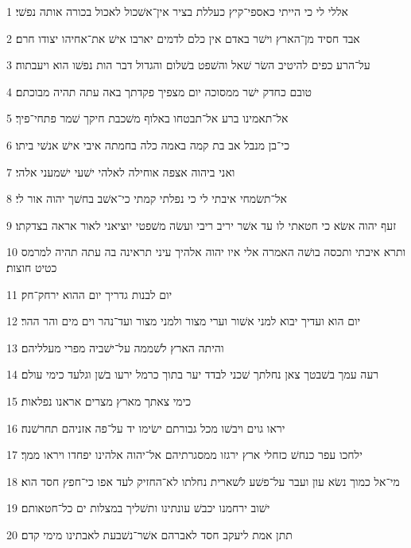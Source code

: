 \par 1 אללי לי כי הייתי כאספי־קיץ כעללת בציר אין־אשׁכול לאכול בכורה אותה נפשׁי׃
\par 2 אבד חסיד מן־הארץ וישׁר באדם אין כלם לדמים יארבו אישׁ את־אחיהו יצודו חרם׃
\par 3 על־הרע כפים להיטיב השׂר שׁאל והשׁפט בשׁלום והגדול דבר הות נפשׁו הוא ויעבתוה׃
\par 4 טובם כחדק ישׁר ממסוכה יום מצפיך פקדתך באה עתה תהיה מבוכתם׃
\par 5 אל־תאמינו ברע אל־תבטחו באלוף משׁכבת חיקך שׁמר פתחי־פיך׃
\par 6 כי־בן מנבל אב בת קמה באמה כלה בחמתה איבי אישׁ אנשׁי ביתו׃
\par 7 ואני ביהוה אצפה אוחילה לאלהי ישׁעי ישׁמעני אלהי׃
\par 8 אל־תשׂמחי איבתי לי כי נפלתי קמתי כי־אשׁב בחשׁך יהוה אור לי׃
\par 9 זעף יהוה אשׂא כי חטאתי לו עד אשׁר יריב ריבי ועשׂה משׁפטי יוציאני לאור אראה בצדקתו׃
\par 10 ותרא איבתי ותכסה בושׁה האמרה אלי איו יהוה אלהיך עיני תראינה בה עתה תהיה למרמס כטיט חוצות׃
\par 11 יום לבנות גדריך יום ההוא ירחק־חק׃
\par 12 יום הוא ועדיך יבוא למני אשׁור וערי מצור ולמני מצור ועד־נהר וים מים והר ההר׃
\par 13 והיתה הארץ לשׁממה על־ישׁביה מפרי מעלליהם׃
\par 14 רעה עמך בשׁבטך צאן נחלתך שׁכני לבדד יער בתוך כרמל ירעו בשׁן וגלעד כימי עולם׃
\par 15 כימי צאתך מארץ מצרים אראנו נפלאות׃
\par 16 יראו גוים ויבשׁו מכל גבורתם ישׂימו יד על־פה אזניהם תחרשׁנה׃
\par 17 ילחכו עפר כנחשׁ כזחלי ארץ ירגזו ממסגרתיהם אל־יהוה אלהינו יפחדו ויראו ממך׃
\par 18 מי־אל כמוך נשׂא עון ועבר על־פשׁע לשׁארית נחלתו לא־החזיק לעד אפו כי־חפץ חסד הוא׃
\par 19 ישׁוב ירחמנו יכבשׁ עונתינו ותשׁליך במצלות ים כל־חטאותם׃
\par 20 תתן אמת ליעקב חסד לאברהם אשׁר־נשׁבעת לאבתינו מימי קדם׃


